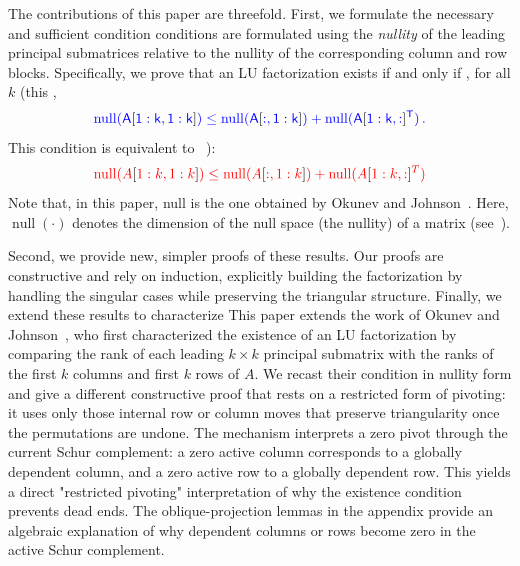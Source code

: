 \documentclass[10pt,twoside]{siamart1116}
\DeclareMathOperator{\nl}{null}
\numberwithin{theorem}{section}
\providecommand{\DIFadd}[1]{{\protect\color{blue} \sf #1}} %
\providecommand{\DIFdel}[1]{{\protect\color{red} \scriptsize #1}} %
\providecommand{\DIFaddbegin}{} %
\providecommand{\DIFaddend}{} %
\providecommand{\DIFdelbegin}{} %
\providecommand{\DIFdelend}{} %
\begin{document}
The \DIFdelbegin \DIFdel{contributions of this paper are threefold. First, we formulate the necessary and sufficient condition }\DIFdelend \DIFaddbegin \DIFadd{conditions are formulated }\DIFaddend using the \emph{nullity} of the leading principal submatrices relative to the nullity of the corresponding column and row blocks. Specifically, we prove that an LU factorization exists if and only if\DIFaddbegin \DIFadd{, }\DIFaddend for all $k$\DIFdelbegin \DIFdel{(this }\DIFdelend \DIFaddbegin \DIFadd{,
}\[
  \DIFadd{\nl(A}[\DIFadd{1:k,1:k}]\DIFadd{) \le \nl(A}[\DIFadd{:,1:k}]\DIFadd{) + \nl(}{\DIFadd{A}[\DIFadd{1:k,:}]}\DIFadd{^T) \,.
}\]
\DIFadd{This }\DIFaddend condition is equivalent to \DIFdelbegin \DIFdel{~\cite{okunev_necessary_2005}):
}\[
	\DIFdel{\nl(A}[\DIFdel{1:k,1:k}]\DIFdel{) \le \nl(A}[\DIFdel{:,1:k}]\DIFdel{) + \nl(}{\DIFdel{A}[\DIFdel{1:k,:}]}\DIFdel{^T)
}\]%
\DIFdel{Note that, in this paper, null is }\DIFdelend \DIFaddbegin \DIFadd{the one obtained by Okunev and Johnson~\cite{okunev_necessary_2005}. Here, $\nl(\cdot)$ denotes }\DIFaddend the dimension of the null space \DIFaddbegin \DIFadd{(the nullity) }\DIFaddend of a matrix (see~).

\DIFdelbegin \DIFdel{Second, we provide new, simpler proofs of these results. Our proofs are constructive and rely on induction, explicitly building the factorization by handling the singular cases while preserving the triangular structure. Finally, we extend these results to characterize }\DIFdelend \DIFaddbegin \DIFadd{This paper extends the work of Okunev and Johnson~\cite{okunev_necessary_2005}, who first characterized the existence of an LU factorization by comparing the rank of each leading $k \times k$ principal submatrix with the ranks of the first $k$ columns and first $k$ rows of $A$. We recast their condition in nullity form and give a different constructive proof that rests on a restricted form of pivoting: it uses only those internal row or column moves that preserve triangularity once the permutations are undone. The mechanism interprets a zero pivot through the current Schur complement: a zero active column corresponds to a globally dependent column, and a zero active row to a globally dependent row. This yields a direct "restricted pivoting" interpretation of why the existence condition prevents dead ends. The oblique-projection lemmas in the appendix provide an algebraic explanation of why dependent columns or rows become zero in the active Schur complement.
}
\end{document}

